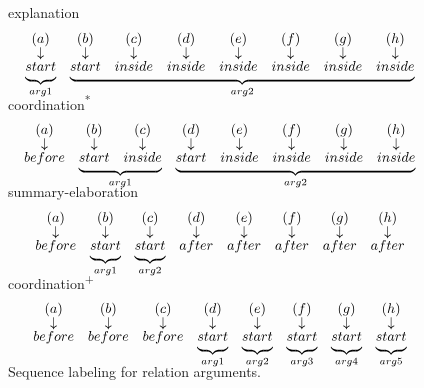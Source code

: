 \begin{figure}[ht]
\centering

explanation
\[
\begin{array}{*8{c}}
(a)&(b)&(c)&(d)&(e)&(f)&(g)&(h)\\[-2pt]
\downarrow&\downarrow&\downarrow&\downarrow&\downarrow&\downarrow&\downarrow&\downarrow\\[-2pt]
\undermat{arg1}{start}&\undermat{arg2}{start&inside&inside&inside&inside&inside&inside}
\end{array}
\]
\vspace{1em}

coordination\textsuperscript{*}
\[
\begin{array}{*8{c}}
(a)&(b)&(c)&(d)&(e)&(f)&(g)&(h)\\[-2pt]
\downarrow&\downarrow&\downarrow&\downarrow&\downarrow&\downarrow&\downarrow&\downarrow\\[-2pt]
before&\undermat{arg1}{start&inside}&\undermat{arg2}{start&inside&inside&inside&inside}
\end{array}
\]
\vspace{1em}

summary-elaboration
\[
\begin{array}{*8{c}}
(a)&(b)&(c)&(d)&(e)&(f)&(g)&(h)\\[-2pt]
\downarrow&\downarrow&\downarrow&\downarrow&\downarrow&\downarrow&\downarrow&\downarrow\\[-2pt]
before&\undermat{arg1}{start}&\undermat{arg2}{start}&after&after&after&after&after
\end{array}
\]
\vspace{1em}

coordination\textsuperscript{+}
\[
\begin{array}{*8{c}}
(a)&(b)&(c)&(d)&(e)&(f)&(g)&(h)\\[-2pt]
\downarrow&\downarrow&\downarrow&\downarrow&\downarrow&\downarrow&\downarrow&\downarrow\\[-2pt]
before&before&before&\undermat{arg1}{start}&\undermat{arg2}{start}&\undermat{arg3}{start}&\undermat{arg4}{start}&\undermat{arg5}{start}
\end{array}
\]
\vspace{1em}

\caption{\label{i:rare-args} Sequence labeling for relation arguments. }

\end{figure}
